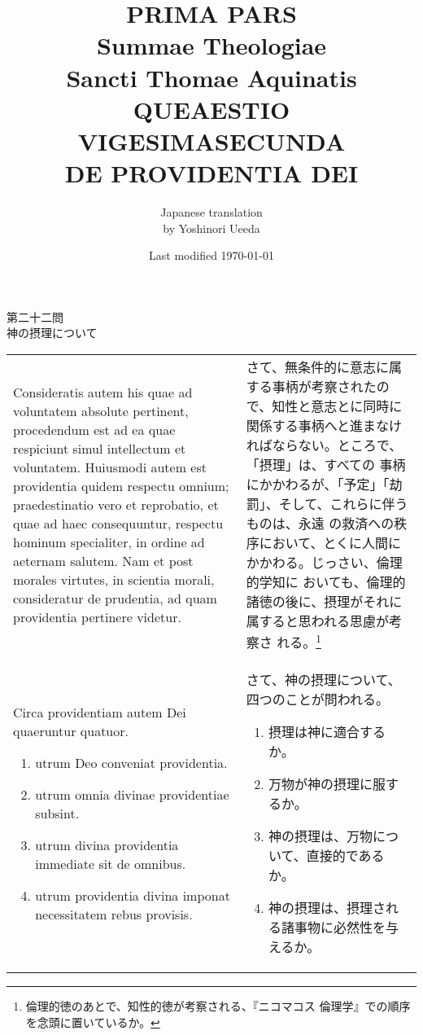 \documentclass[10pt]{jsarticle} %
\title{{\bf PRIMA PARS}\\{\HUGE Summae Theologiae}\\Sancti Thomae
Aquinatis\\{\sffamily QUEAESTIO VIGESIMASECUNDA}\\DE PROVIDENTIA DEI}
\author{Japanese translation\\by Yoshinori {\sc Ueeda}}
\date{Last modified \today}
\begin{document}
\maketitle
\pagestyle{fancy}

\begin{center}
{\Large 第二十二問\\神の摂理について}
\end{center}


\begin{longtable}{p{21em}p{21em}}
Consideratis autem his quae ad voluntatem absolute pertinent,
 procedendum est ad ea quae respiciunt simul intellectum et
 voluntatem. Huiusmodi autem est providentia quidem respectu omnium;
 praedestinatio vero et reprobatio, et quae ad haec consequuntur,
 respectu hominum specialiter, in ordine ad aeternam salutem. Nam et
 post morales virtutes, in scientia morali, consideratur de prudentia,
 ad quam providentia pertinere videtur. 


&

さて、無条件的に意志に属する事柄が考察されたので、知性と意志とに同時に
 関係する事柄へと進まなければならない。ところで、「摂理」は、すべての
 事柄にかかわるが、「予定」「劫罰」、そして、これらに伴うものは、永遠
 の救済への秩序において、とくに人間にかかわる。じっさい、倫理的学知に
 おいても、倫理的諸徳の後に、摂理がそれに属すると思われる思慮が考察さ
 れる。\footnote{倫理的徳のあとで、知性的徳が考察される、『ニコマコス
 倫理学』での順序を念頭に置いているか。}

\\

Circa providentiam autem Dei
 quaeruntur quatuor. 

\begin{enumerate}
 \item utrum Deo conveniat providentia.
 \item utrum omnia divinae providentiae subsint.
 \item utrum divina providentia immediate sit de omnibus.
 \item utrum providentia divina imponat necessitatem rebus provisis.
\end{enumerate}

&

さて、神の摂理について、四つのことが問われる。

\begin{enumerate}
 \item 摂理は神に適合するか。
 \item 万物が神の摂理に服するか。
 \item 神の摂理は、万物について、直接的であるか。
 \item 神の摂理は、摂理される諸事物に必然性を与えるか。
\end{enumerate}


\end{longtable}
\newpage
\end{document}

